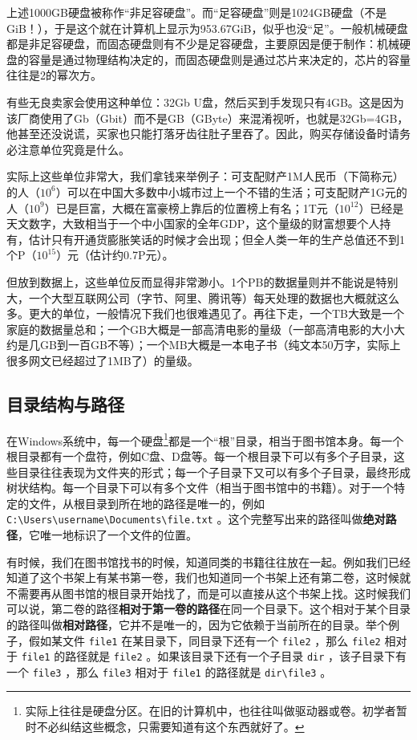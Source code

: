 上述1000GB硬盘被称作“非足容硬盘”。而“足容硬盘”则是1024GB硬盘（不是GiB！），于是这个就在计算机上显示为953.67GiB，似乎也没“足”。一般机械硬盘都是非足容硬盘，而固态硬盘则有不少是足容硬盘，主要原因是便于制作：机械硬盘的容量是通过物理结构决定的，而固态硬盘则是通过芯片来决定的，芯片的容量往往是2的幂次方。

\begin{caution}
  有些无良卖家会使用这种单位：32Gb U盘，然后买到手发现只有4GB。这是因为该厂商使用了Gb（Gbit）而不是GB（GByte）来混淆视听，也就是32Gb=4GB，他甚至还没说谎，买家也只能打落牙齿往肚子里吞了。因此，购买存储设备时请务必注意单位究竟是什么。
\end{caution}

实际上这些单位非常大，我们拿钱来举例子：可支配财产1M人民币（下简称元）的人（$10^6$）可以在中国大多数中小城市过上一个不错的生活；可支配财产1G元的人（$10^9$）已是巨富，大概在富豪榜上靠后的位置榜上有名；1T元（$10^{12}$）已经是天文数字，大致相当于一个中小国家的全年GDP，这个量级的财富想要个人持有，估计只有开通货膨胀笑话的时候才会出现；但全人类一年的生产总值还不到1个P（$10^{15}$）元（估计约0.7P元）。

但放到数据上，这些单位反而显得非常渺小。1个PB的数据量则并不能说是特别大，一个大型互联网公司（字节、阿里、腾讯等）每天处理的数据也大概就这么多。更大的单位，一般情况下我们也很难遇见了。再往下走，一个TB大致是一个家庭的数据量总和；一个GB大概是一部高清电影的量级（一部高清电影的大小大约是几GB到一百GB不等）；一个MB大概是一本电子书（纯文本50万字，实际上很多网文已经超过了1MB了）的量级。

\subsection{目录结构与路径}

在Windows系统中，每一个硬盘\footnote{实际上往往是硬盘分区。在旧的计算机中，也往往叫做驱动器或卷。初学者暂时不必纠结这些概念，只需要知道有这个东西就好了。}都是一个“根”目录，相当于图书馆本身。每一个根目录都有一个盘符，例如C盘、D盘等。每一个根目录下可以有多个子目录，这些目录往往表现为文件夹的形式；每一个子目录下又可以有多个子目录，最终形成树状结构。每一个目录下可以有多个文件（相当于图书馆中的书籍）。对于一个特定的文件，从根目录到所在地的路径是唯一的，例如 \texttt{C:\textbackslash Users\textbackslash username\textbackslash Documents\textbackslash file.txt} 。这个完整写出来的路径叫做\textbf{绝对路径}，它唯一地标识了一个文件的位置。

有时候，我们在图书馆找书的时候，知道同类的书籍往往放在一起。例如我们已经知道了这个书架上有某书第一卷，我们也知道同一个书架上还有第二卷，这时候就不需要再从图书馆的根目录开始找了，而是可以直接从这个书架上找。这时候我们可以说，第二卷的路径\textbf{相对于第一卷的路径}在同一个目录下。这个相对于某个目录的路径叫做\textbf{相对路径}，它并不是唯一的，因为它依赖于当前所在的目录。举个例子，假如某文件 \texttt{file1} 在某目录下，同目录下还有一个 \texttt{file2} ，那么 \texttt{file2} 相对于 \texttt{file1} 的路径就是 \texttt{file2} 。如果该目录下还有一个子目录 \texttt{dir} ，该子目录下有一个 \texttt{file3} ，那么 \texttt{file3} 相对于 \texttt{file1} 的路径就是 \texttt{dir\textbackslash file3} 。


